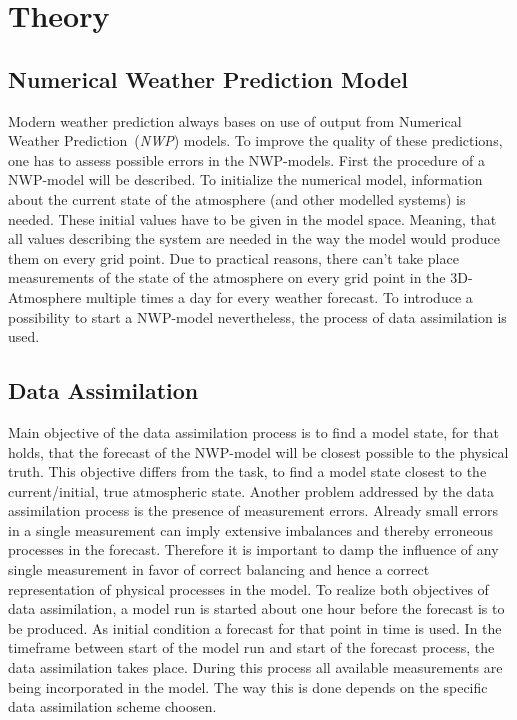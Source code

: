 \chapter{Theory}
\setcounter{page}{1}
\section{Numerical Weather Prediction Model}
\p
Modern weather prediction always bases on use of output from Numerical Weather Prediction~(\emph{NWP}) models. To improve the quality of these predictions, one has to assess possible errors in the NWP-models. First the procedure of a NWP-model will be described.\cite{grandy2004time}
\p
To initialize the numerical model, information about the current state of the atmosphere (and other modelled systems) is needed. These initial values have to be given in the \glqq model space\grqq. Meaning, that all values describing the system are needed in the way the model would produce them on every grid point.
\p
Due to practical reasons, there can't take place measurements of the state of the atmosphere on every grid point in the 3D-Atmosphere multiple times a day for every weather forecast. To introduce a possibility to start a NWP-model nevertheless, the process of data assimilation is used.
\section{Data Assimilation}
\p
Main objective of the data assimilation process is to find a model state, for that holds, that the forecast of the NWP-model will be closest possible to the physical truth. This objective differs from the task, to find a model state closest to the current/initial, true atmospheric state.
\p
Another problem addressed by the data assimilation process is the presence of measurement errors. Already small errors in a single measurement can imply extensive imbalances and thereby erroneous processes in the forecast. Therefore it is important to damp the influence of any single measurement in favor of correct balancing and hence a correct representation of physical processes in the model.
\p 
To realize both objectives of data assimilation, a model run is started about one hour before the forecast is to be produced. As initial condition a forecast for that point in time is used. In the timeframe between start of the model run and start of the forecast process, the data assimilation takes place. During this process all available measurements are being incorporated in the model. The way this is done depends on the specific data assimilation scheme choosen. 
